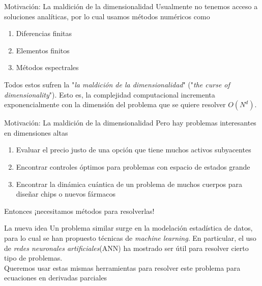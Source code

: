 \documentclass[aspectratio=169,xcolor=dvipsnames]{beamer}
\begin{document}
\begin{frame}{Motivación: La maldición de la dimensionalidad}
Usualmente no tenemos acceso a soluciones analíticas, por lo cual usamos métodos numéricos como
\begin{enumerate}
	\item Diferencias finitas
	\item Elementos finitos
	\item Métodos espectrales
\end{enumerate}
Todos estos sufren la "\textit{la maldición de la dimensionalidad}" ("\textit{the curse of dimensionality}"). Esto es, la complejidad computacional incrementa exponencialmente con la dimensión del problema que se quiere resolver $O(N^d)$.
\end{frame}

\begin{frame}{Motivación: La maldición de la dimensionalidad}
	Pero hay problemas interesantes en dimensiones altas
	\begin{enumerate}
		\item Evaluar el precio justo de una opción que tiene muchos activos subyacentes
		\item Encontrar controles óptimos para problemas con espacio de estados grande
		\item Encontrar la dinámica cuántica de un problema de muchos cuerpos para diseñar chips o nuevos fármacos
	\end{enumerate}
Entonces ¡necesitamos métodos para resolverlas!
\end{frame}
\begin{frame}{La nueva idea}
	Un problema similar surge en la modelación estadística de datos, para lo cual se han propuesto técnicas de \textit{machine learning}. En particular, el uso de \textit{redes neuronales artificiales}(ANN) ha mostrado ser útil para resolver cierto tipo de problemas.\\
	\vspace*{5mm}
	Queremos usar estas mismas herramientas para resolver este problema para ecuaciones en derivadas parciales
\end{frame}
\end{document}
